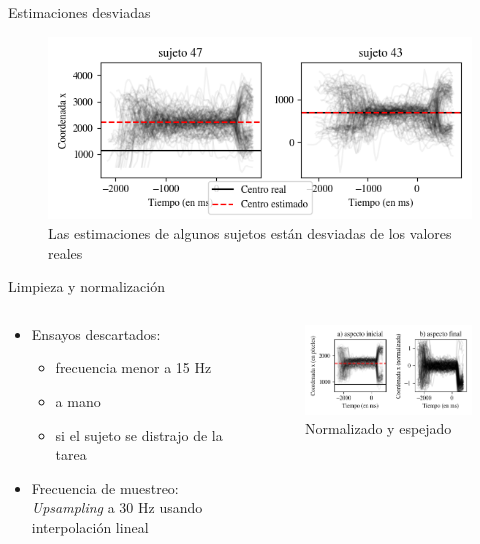 \documentclass[aspectratio=169]{beamer}
\begin{document}
\begin{frame}{Estimaciones desviadas}
  \begin{figure}
    \centering
    \includegraphics[width=\linewidth]{plots/skewed-estimations-examples.png}
    \caption{Las estimaciones de algunos sujetos están desviadas de los valores reales}
  \end{figure}
\end{frame}

\begin{frame}{Limpieza y normalización}
  \begin{columns}
    \begin{column}{0.4\textwidth}
      \begin{itemize}
        \item Ensayos descartados: \begin{itemize}
          \item frecuencia menor a 15 Hz
          \item a mano
          \item si el sujeto se distrajo de la tarea
        \end{itemize}
        \item Frecuencia de muestreo: \textit{Upsampling} a 30 Hz usando
          interpolación lineal
      \end{itemize}
    \end{column}
    \begin{column}{0.6\textwidth}
      \begin{figure}
        \centering
        \includegraphics[width=\linewidth]{plots/normalization-example.png}
        \caption{Normalizado y espejado}
      \end{figure}
    \end{column}
  \end{columns}
\end{frame}
\end{document}
